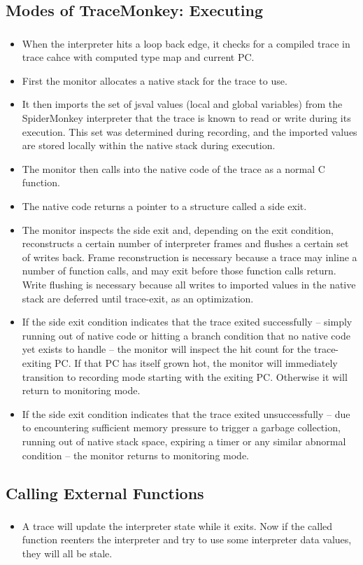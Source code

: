\documentclass[mathserif,10pt]{beamer}
\begin{document}
\subsection{Modes of TraceMonkey: Executing}
\frame
{
  \frametitle{\subsecname}
  \begin{itemize} 
  \item
    When the interpreter hits a loop back edge, it checks for a compiled trace in trace cahce with computed type map and current PC.
  \item 
    First the monitor allocates a native stack for the trace to use.
 \item   
It then imports the set of jsval values (local and global variables) from the SpiderMonkey interpreter that the trace is known to read or write during its execution. This set was determined during recording, and the imported values are stored locally within the native stack during execution.
\item
The monitor then calls into the native code of the trace as a normal C function.
\item
The native code returns a pointer to a structure called a side exit.
\item
The monitor inspects the side exit and, depending on the exit condition, reconstructs a certain number of interpreter frames and flushes a certain set of writes back. Frame reconstruction is necessary because a trace may inline a number of function calls, and may exit before those function calls return. Write flushing is necessary because all writes to imported values in the native stack are deferred until trace-exit, as an optimization.
\item
If the side exit condition indicates that the trace exited successfully -- simply running out of native code or hitting a branch condition that no native code yet exists to handle -- the monitor will inspect the hit count for the trace-exiting PC. If that PC has itself grown hot, the monitor will immediately transition to recording mode starting with the exiting PC. Otherwise it will return to monitoring mode.
\item
If the side exit condition indicates that the trace exited unsuccessfully -- due to encountering sufficient memory pressure to trigger a garbage collection, running out of native stack space, expiring a timer or any similar abnormal condition -- the monitor returns to monitoring mode.
  \end{itemize}  
}

\subsection{Calling External Functions}
\frame
{
  \frametitle{\subsecname}
  \begin{itemize}
    \item A trace will update the interpreter state while it exits. Now if the called function
      reenters the interpreter and try to use some interpreter data values, they will all be stale.
  \end{itemize}
}
\end{document}
